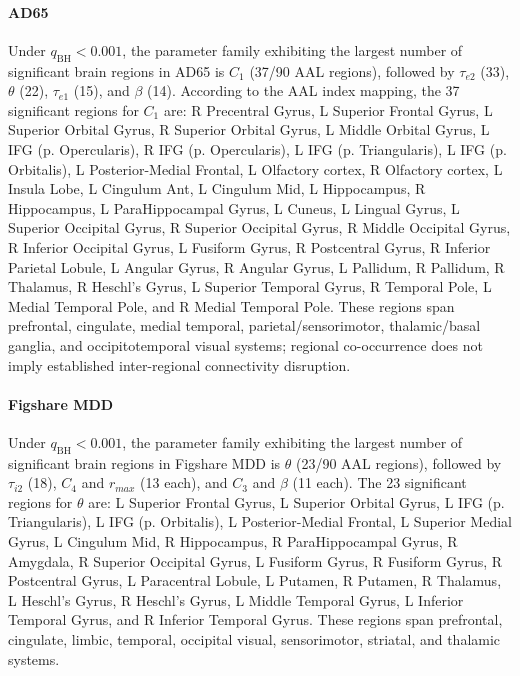 \documentclass[11pt]{article}
\begin{document}
\paragraph{AD65}
Under \(q_{\mathrm{BH}}<0.001\), the parameter family exhibiting the largest number of significant brain regions in AD65 is \texttt{$C_1$} (37/90 AAL regions), followed by \texttt{$\tau_{e2}$} (33), \texttt{$\theta$} (22), \texttt{$\tau_{e1}$} (15), and \texttt{$\beta$} (14). According to the AAL index mapping, the 37 significant regions for \texttt{$C_1$} are:
R Precentral Gyrus, L Superior Frontal Gyrus, L Superior Orbital Gyrus, R Superior Orbital Gyrus, L Middle Orbital Gyrus, L IFG (p. Opercularis), R IFG (p. Opercularis), L IFG (p. Triangularis), L IFG (p. Orbitalis), L Posterior-Medial Frontal, L Olfactory cortex, R Olfactory cortex, L Insula Lobe, L Cingulum Ant, L Cingulum Mid, L Hippocampus, R Hippocampus, L ParaHippocampal Gyrus, L Cuneus, L Lingual Gyrus, L Superior Occipital Gyrus, R Superior Occipital Gyrus, R Middle Occipital Gyrus, R Inferior Occipital Gyrus, L Fusiform Gyrus, R Postcentral Gyrus, R Inferior Parietal Lobule, L Angular Gyrus, R Angular Gyrus, L Pallidum, R Pallidum, R Thalamus, R Heschl's Gyrus, L Superior Temporal Gyrus, R Temporal Pole, L Medial Temporal Pole, and R Medial Temporal Pole. These regions span prefrontal, cingulate, medial temporal, parietal/sensorimotor, thalamic/basal ganglia, and occipitotemporal visual systems; regional co-occurrence does not imply established inter-regional connectivity disruption.

\paragraph{Figshare MDD}
Under \(q_{\mathrm{BH}}<0.001\), the parameter family exhibiting the largest number of significant brain regions in Figshare MDD is \texttt{$\theta$} (23/90 AAL regions), followed by \texttt{$\tau_{i2}$} (18), \texttt{$C_4$} and \texttt{$r_{max}$} (13 each), and \texttt{$C_3$} and \texttt{$\beta$} (11 each). The 23 significant regions for \texttt{$\theta$} are:
L Superior Frontal Gyrus, L Superior Orbital Gyrus, L IFG (p. Triangularis), L IFG (p. Orbitalis), L Posterior-Medial Frontal, L Superior Medial Gyrus, L Cingulum Mid, R Hippocampus, R ParaHippocampal Gyrus, R Amygdala, R Superior Occipital Gyrus, L Fusiform Gyrus, R Fusiform Gyrus, R Postcentral Gyrus, L Paracentral Lobule, L Putamen, R Putamen, R Thalamus, L Heschl's Gyrus, R Heschl's Gyrus, L Middle Temporal Gyrus, L Inferior Temporal Gyrus, and R Inferior Temporal Gyrus. These regions span prefrontal, cingulate, limbic, temporal, occipital visual, sensorimotor, striatal, and thalamic systems.
\end{document}
